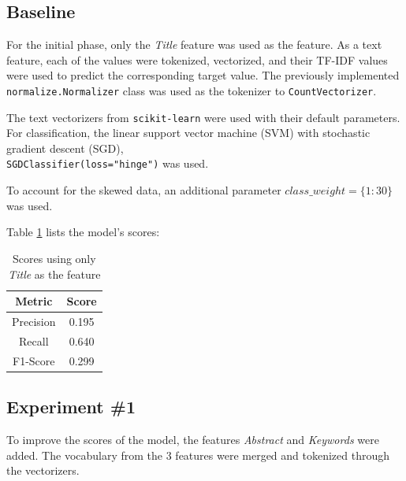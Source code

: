 \documentclass[11pt]{article}
\begin{document}
\subsection{Baseline}
For the initial phase, only the \textit{Title} feature was used as the feature. As a text feature, each of the values were tokenized, vectorized, and their TF-IDF values were used to predict the corresponding target value. The previously implemented \texttt{normalize.Normalizer} class was used as the tokenizer to \texttt{CountVectorizer}.

The text vectorizers from \texttt{scikit-learn} were used with their default parameters. For classification, the linear support vector machine (SVM) with stochastic gradient descent (SGD), \\
\texttt{SGDClassifier(loss="hinge")} was used.

To account for the skewed data, an additional parameter $class\_weight=\{1:30\}$ was used.

Table \ref{table:base_score} lists the model's scores:
\begin{table}[!ht]
    \caption{Scores using only \textit{Title} as the feature}
    \label{table:base_score}
    \begin{center}

        \begin{tabular}{| c | c |}
        \hline
        \textbf{Metric} & \textbf{Score}
        \\ \hline
        Precision & 0.195 
        \\ \hline
        Recall & 0.640
        \\ \hline
        F1-Score & 0.299
        \\ \hline
        \end{tabular}

    \end{center}

\end{table}

\subsection{Experiment \#1}
To improve the scores of the model, the features \textit{Abstract} and \textit{Keywords} were added. The vocabulary from the 3 features were merged and tokenized through the vectorizers. 
\end{document}
